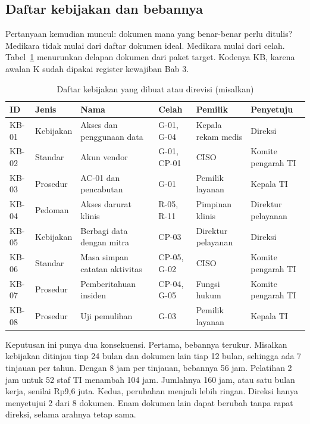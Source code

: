 \subsection*{Daftar kebijakan dan bebannya}

Pertanyaan kemudian muncul: dokumen mana yang benar-benar perlu ditulis? Medikara tidak mulai dari
daftar dokumen ideal. Medikara mulai dari celah. Tabel~\ref{tab:ch08-daftar-kebijakan} menurunkan
delapan dokumen dari paket target. Kodenya KB, karena awalan K sudah dipakai register kewajiban
Bab 3.

\begin{table}[!htb]
  \centering\footnotesize
  \caption{Daftar kebijakan yang dibuat atau direvisi (misalkan)}
  \label{tab:ch08-daftar-kebijakan}
  \begin{tabularx}{\textwidth}{|>{\raggedright\arraybackslash}p{}|>{\raggedright\arraybackslash}p{}|>{\raggedright\arraybackslash}X|>{\raggedright\arraybackslash}p{}|>{\raggedright\arraybackslash}p{}|>{\raggedright\arraybackslash}p{}|}
    \hline
    \textbf{ID} & \textbf{Jenis} & \textbf{Nama} & \textbf{Celah} & \textbf{Pemilik} &
    \textbf{Penyetuju} \\ \hline
    KB-01 & Kebijakan & Akses dan penggunaan data & G-01, G-04 & Kepala rekam medis & Direksi \\
    \hline
    KB-02 & Standar & Akun vendor & G-01, CP-01 & CISO & Komite pengarah TI \\ \hline
    KB-03 & Prosedur & AC-01 dan pencabutan & G-01 & Pemilik layanan & Kepala TI \\ \hline
    KB-04 & Pedoman & Akses darurat klinis & R-05, R-11 & Pimpinan klinis & Direktur pelayanan \\
    \hline
    KB-05 & Kebijakan & Berbagi data dengan mitra & CP-03 & Direktur pelayanan & Direksi \\ \hline
    KB-06 & Standar & Masa simpan catatan aktivitas & CP-05, G-02 & CISO & Komite pengarah TI \\
    \hline
    KB-07 & Prosedur & Pemberitahuan insiden & CP-04, G-05 & Fungsi hukum & Komite pengarah TI \\
    \hline
    KB-08 & Prosedur & Uji pemulihan & G-03 & Pemilik layanan & Kepala TI \\ \hline
  \end{tabularx}
\end{table}

Keputusan ini punya dua konsekuensi. Pertama, bebannya terukur. Misalkan kebijakan ditinjau tiap
24 bulan dan dokumen lain tiap 12 bulan, sehingga ada 7 tinjauan per tahun. Dengan 8 jam per
tinjauan, bebannya 56 jam. Pelatihan 2 jam untuk 52 staf TI menambah 104 jam. Jumlahnya 160 jam,
atau satu bulan kerja, senilai Rp9,6 juta. Kedua, perubahan menjadi lebih ringan. Direksi hanya
menyetujui 2 dari 8 dokumen. Enam dokumen lain dapat berubah tanpa rapat direksi, selama arahnya
tetap sama.

